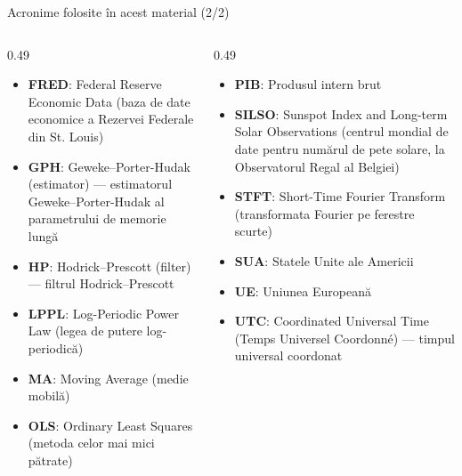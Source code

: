 \begin{frame}{Acronime folosite în acest material (2/2)}
\begin{columns}[T]
\begin{column}{0.49\textwidth}
\begin{itemize}\setlength{\itemsep}{0pt}
    \item \textbf{FRED}: Federal Reserve Economic Data (baza de date economice a Rezervei Federale din St. Louis)
    \item \textbf{GPH}: Geweke–Porter-Hudak (estimator) — estimatorul Geweke–Porter-Hudak al parametrului de memorie lungă
    \item \textbf{HP}: Hodrick–Prescott (filter) — filtrul Hodrick–Prescott
    \item \textbf{LPPL}: Log-Periodic Power Law (legea de putere log-periodică)
    \item \textbf{MA}: Moving Average (medie mobilă)
    \item \textbf{OLS}: Ordinary Least Squares (metoda celor mai mici pătrate)
\end{itemize}
\end{column}
\begin{column}{0.49\textwidth}
\begin{itemize}\setlength{\itemsep}{0pt}
    \item \textbf{PIB}: Produsul intern brut
    \item \textbf{SILSO}: Sunspot Index and Long-term Solar Observations (centrul mondial de date pentru numărul de pete solare, la Observatorul Regal al Belgiei)
    \item \textbf{STFT}: Short-Time Fourier Transform (transformata Fourier pe ferestre scurte)
    \item \textbf{SUA}: Statele Unite ale Americii
    \item \textbf{UE}: Uniunea Europeană
    \item \textbf{UTC}: Coordinated Universal Time (Temps Universel Coordonné) — timpul universal coordonat
\end{itemize}
\end{column}
\end{columns}
\end{frame}

